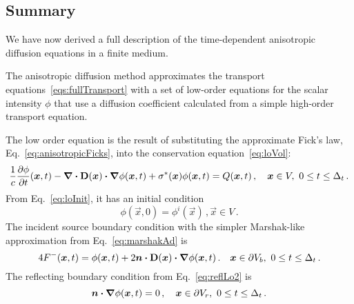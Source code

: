 \subsection{Summary}
We have now derived a full description of the time-dependent anisotropic
diffusion equations in a finite medium. 

The anisotropic diffusion method approximates the transport
equations~\eqref{eqs:fullTransport} with a set of low-order equations for the
scalar intensity $\phi$ that use a diffusion coefficient calculated from a
simple high-order transport equation.

The low order equation is the result of substituting the approximate Fick's law,
Eq.~\eqref{eq:anisotropicFicks}, into the conservation equation~\eqref{eq:loVol}:
\begin{equation*}
\frac{1}{c} \frac{\partial \phi}{\partial t} (\bm{x}, t)
  - \bm{\nabla} \bm{\cdot} \mathbf{D}(\bm{x}) \bm{\cdot} \bm{\nabla} \phi(\bm{x},t)
  + \sigma^\ast(\bm{x}) \phi(\bm{x}, t)
  = Q(\bm{x}, t) \,,
  \quad \bm{x} \in V,\ 0 \le t \le \Delta_t \,.
\end{equation*}
From Eq.~\eqref{eq:loInit}, it has an initial condition
\begin{equation*}
\phi(\vec{x}, 0) = \phi^i(\vec{x})\,, \vec{x} \in V  \,.
\end{equation*}
The incident source boundary condition with the simpler Marshak-like
approximation from Eq.~\eqref{eq:marshakAd} is
\begin{equation*}
  4 F^-(\bm{x}, t)
  = \phi(\bm{x}, t)
  + 2 \bm{n} \bm{\cdot} \mathbf{D}(\bm{x}) \bm{\cdot} \bm{\nabla} \phi(\bm{x}, t) \,.
 \quad \bm{x} \in \partial V_b,\ 0 \le t \le \Delta_t \,.
\end{equation*}
The reflecting boundary condition from Eq.~\eqref{eq:reflLo2} is
\begin{equation*}
  \bm{n}\bm{\cdot}\bm{\nabla} \phi(\bm{x}, t) = 0 \,,
 \quad \bm{x} \in \partial V_r,\ 0 \le t \le \Delta_t \,.
\end{equation*}

